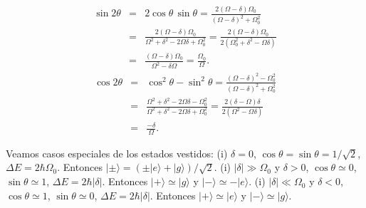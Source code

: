 \documentclass[twocolumn,aps,eqsecnum]{revtex4}
\providecommand{\ket}[1]{\lvert #1 \rangle}
\begin{document}
%
\begin{eqnarray*}
\sin{2\theta} &=& 2 \cos{\theta} \,\sin{\theta} 
 = \frac{2(\Omega -\delta) \Omega_0}{(\Omega -\delta)^2 +\Omega_0^2} \\ 
&=& \frac{2(\Omega -\delta) \Omega_0}
    {\Omega^2 +\delta^2 -2 \Omega \delta +\Omega_0^2} 
    = \frac{2(\Omega -\delta) \Omega_0}
    {2( \Omega_0^2 +\delta^2 -\Omega \delta )}     \\ 
    &=& \frac{(\Omega -\delta) \Omega_0}{\Omega^2 -\delta \Omega} 
    = \frac{\Omega_0}{\Omega} .
\end{eqnarray*}
%
\begin{eqnarray*}
\cos{2\theta} &=& \cos^2{\theta} -\sin^2{\theta} 
 = \frac{(\Omega -\delta)^2 -\Omega_0^2}{(\Omega -\delta)^2 
     +\Omega_0^2} \\ 
&=& \frac{\Omega^2 +\delta^2 -2 \Omega \delta -\Omega_0^2}
    {\Omega^2 +\delta^2 -2 \Omega \delta +\Omega_0^2} 
    = \frac{2(\delta -\Omega) \delta} 
    {2( \Omega^2 -\Omega \delta )}     \\ 
    &=& \frac{-\delta}{\Omega} .
\end{eqnarray*}

Veamos casos especiales de los estados vestidos:  
\newline (i) $\delta =0$, $\cos{\theta} = \sin{\theta} 
=1/\sqrt{2}$, $\Delta E = 2\hbar \Omega_0$. Entonces 
$\ket{\pm} = (\pm \ket{e} +\ket{g} )/ \sqrt{2}$. 
\newline (i) $|\delta| \gg \Omega_0$ y $\delta >0$, 
$\cos{\theta} \simeq 0$, $\sin{\theta} \simeq 1$, 
$\Delta E = 2\hbar |\delta|$. Entonces 
$\ket{+} \simeq \ket{g}$ y $\ket{-} \simeq -\ket{e}$. 
\newline (i) $|\delta| \ll \Omega_0$ y $\delta <0$, 
$\cos{\theta} \simeq 1$, $\sin{\theta} \simeq 0$, 
$\Delta E = 2\hbar |\delta|$. Entonces 
$\ket{+} \simeq \ket{e}$ y $\ket{-} \simeq \ket{g}$. 
 
\end{document}
